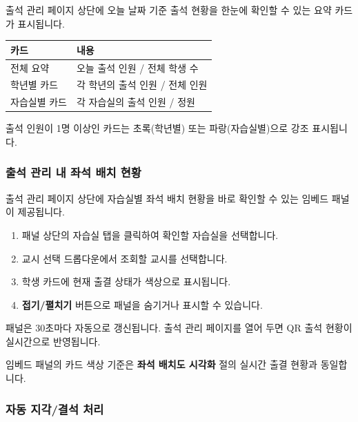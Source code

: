 \documentclass[a4paper,12pt]{article}
\newcommand{\menu}[1]{\textcolor{primary}{\textbf{#1}}}
\begin{document}
출석 관리 페이지 상단에 오늘 날짜 기준 출석 현황을 한눈에 확인할 수 있는 요약 카드가 표시됩니다.

\begin{center}
\begin{tabular}{ll}
\toprule
\textbf{카드} & \textbf{내용} \\
\midrule
전체 요약 & 오늘 출석 인원 / 전체 학생 수 \\
학년별 카드 & 각 학년의 출석 인원 / 전체 인원 \\
자습실별 카드 & 각 자습실의 출석 인원 / 정원 \\
\bottomrule
\end{tabular}
\end{center}

출석 인원이 1명 이상인 카드는 초록(학년별) 또는 파랑(자습실별)으로 강조 표시됩니다.

\subsubsection{출석 관리 내 좌석 배치 현황}

출석 관리 페이지 상단에 자습실별 좌석 배치 현황을 바로 확인할 수 있는 임베드 패널이 제공됩니다.

\begin{enumerate}[leftmargin=1.5em]
    \item 패널 상단의 자습실 탭을 클릭하여 확인할 자습실을 선택합니다.
    \item 교시 선택 드롭다운에서 조회할 교시를 선택합니다.
    \item 학생 카드에 현재 출결 상태가 색상으로 표시됩니다.
    \item \menu{접기/펼치기} 버튼으로 패널을 숨기거나 표시할 수 있습니다.
\end{enumerate}

\begin{tipbox}
  패널은 30초마다 자동으로 갱신됩니다. 출석 관리 페이지를 열어 두면 QR 출석 현황이
  실시간으로 반영됩니다.
\end{tipbox}

\begin{notebox}
  임베드 패널의 카드 색상 기준은 \textbf{좌석 배치도 시각화} 절의 실시간 출결 현황과 동일합니다.
\end{notebox}

\subsubsection{자동 지각/결석 처리}
\end{document}
